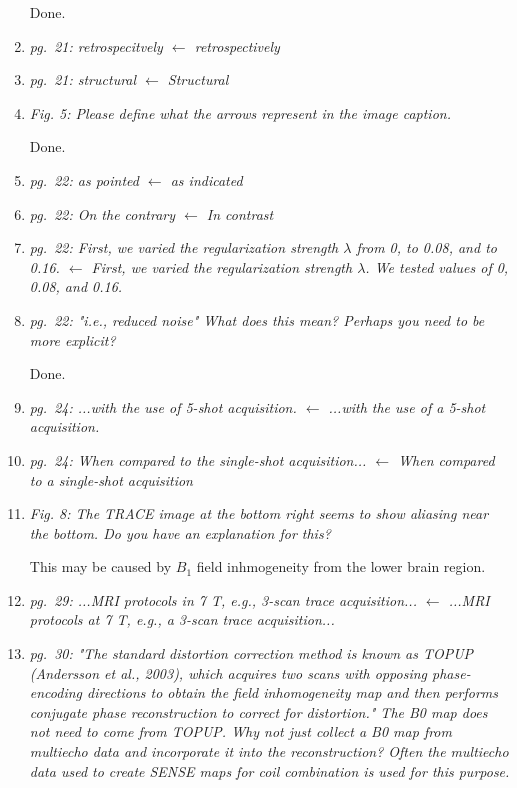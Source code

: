 \documentclass[a4paper,11pt,twoside]{report}
\begin{document}
\begin{enumerate}[resume]
    \hspace{1em} {\color{blue} Done.}

    \item \textit{pg.~21: retrospecitvely $\leftarrow$ retrospectively}
    \item \textit{pg.~21: structural $\leftarrow$ Structural}
    \item \textit{Fig. 5: Please define what the arrows represent in the image caption.}

    \hspace{1em} {\color{blue} Done.}

    \item \textit{pg.~22: as pointed $\leftarrow$ as indicated}
    \item \textit{pg.~22: On the contrary $\leftarrow$ In contrast}
    \item \textit{pg.~22: First, we varied the regularization strength $\lambda$ from 0, to 0.08, and to 0.16. $\leftarrow$ First, we varied the regularization strength $\lambda$. We tested values of 0, 0.08, and 0.16.}
    \item \textit{pg.~22: "i.e., reduced noise" What does this mean? Perhaps you need to be more explicit?}

    \hspace{1em} {\color{blue} Done.}

    \item \textit{pg.~24: ...with the use of 5-shot acquisition. $\leftarrow$ ...with the use of a 5-shot acquisition.}
    \item \textit{pg.~24: When compared to the single-shot acquisition... $\leftarrow$ When compared to a single-shot acquisition}
    \item \textit{Fig. 8: The TRACE image at the bottom right seems to show aliasing near the bottom. Do you have an explanation for this?}

    \hspace{1em} {\color{blue} This may be caused by
    $B_1$ field inhmogeneity from the lower brain region. }

    \item \textit{pg.~29: ...MRI protocols in 7 T, e.g., 3-scan trace acquisition... $\leftarrow$ ...MRI protocols at 7 T, e.g., a 3-scan trace acquisition...}
    \item \textit{pg.~30: "The standard distortion correction method is known as TOPUP (Andersson et al., 2003), which acquires two scans with opposing phase-encoding directions to obtain the field inhomogeneity map and then performs conjugate phase reconstruction to correct for distortion." The B0 map does not need to come from TOPUP. Why not just collect a B0 map from multiecho data and incorporate it into the reconstruction? Often the multiecho data used to create SENSE maps for coil combination is used for this purpose.}


\end{enumerate}
\end{document}
